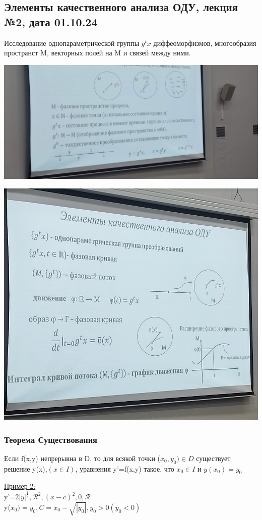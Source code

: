 \documentclass[12pt]{article}
\let\ORIincludegraphics\includegraphics
\renewcommand{\includegraphics}[2][]{\ORIincludegraphics[scale=0.65,#1]{#2}}
\begin{document}
  \subsection{Элементы качественного анализа ОДУ, лекция №2, дата 01.10.24}
  Исследование однопараметрической группы $g^tx$ диффеоморфизмов, многообразия пространст M, векторных полей на M и связей между ними. \par\noindent
  \begin{center}
    \includegraphics[scale=0.5]{"1.3.1.png"}
  \end{center}
  \begin{center}
    \includegraphics[scale=1]{"1.3.2.png"}
  \end{center}
  \subsubsection*{Теорема Существования}\label{th:1.3.1}
  Если f(x,y) непрерывна в D, то для всякой точки ($x_0,y_0)\in D$ существует
  решение y(x),$(x \in I)$, уравнения y'=f(x,y) такое, что $x_0 \in I \text{ и } y(x_0)=y_0$ \par\noindent
  \underline{Пример 2:}\\
  y'=$2|y|^\frac{1}{2},\mathcal{R}^2,(x-c)^2,0,\mathcal{R}$\\
  y($x_0)=y_0,C=x_0-\sqrt{|y_0|},y_0>0(y_0<0)$
\end{document}
